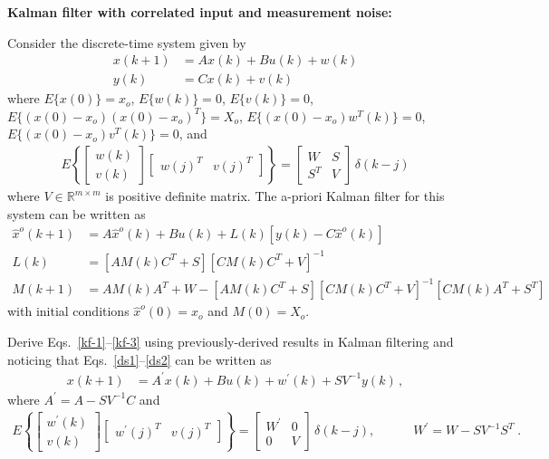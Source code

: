 \item
{\bf Kalman filter with correlated input and measurement noise:}

Consider the discrete-time system given by
\begin{align}
    x(k+1) & = A x(k) + B u(k) + w(k)
        \label{ds1} \\
    y(k) & = C x(k) + v(k)
        \label{ds2}
\end{align}
where $E \{x(0)\} = x_o$, $E\{ w(k) \} = 0$, $E\{v(k)\} = 0$, $E \{ (x(0) - x_o)(x(0) - x_o)^T \} = X_o$, $E\{ (x(0) - x_o) w^T(k) \} = 0$, $E \{(x(0) - x_o) v^T(k) \} = 0$, and
\begin{align*}
    E \left \{ \begin{bmatrix}
            w(k) \\
            v(k)
        \end{bmatrix} \begin{bmatrix}
            w(j)^T & v(j)^T
        \end{bmatrix} \right \} = \begin{bmatrix}
            W & S \\
            S^T & V
        \end{bmatrix} \, \delta(k-j)
\end{align*}
where $V \in \mathbb{R} ^{m \times m}$ is positive definite matrix. The a-priori Kalman filter for this system can be written as
\begin{align}
    \hat{x}^o(k+1) & = A \hat{x}^o(k) + B u(k) + L(k) [ y(k) - C \hat{x}^o(k) ]
        \label{kf-1} \\
    L(k) & = [ A M(k) C^T + S ] [ C M(k) C^T + V ] ^{-1}\\
    M(k+1) & = A M(k) A^T + W - [AM(k) C^T + S] [ C M(k) C^T + V ]^{-1} [CM(k) A^T + S^T]
        \label{kf-3}
\end{align}
with initial conditions $\hat{x}^o(0) = x_o$ and $M(0) = X_o$.

Derive Eqs.~\eqref{kf-1}--\eqref{kf-3} using previously-derived results in Kalman filtering and noticing that Eqs.~\eqref{ds1}--\eqref{ds2} can be written as
\begin{align*}
    x(k+1) & = A^{'} x(k) + B u(k) + w^{'}(k) + SV^{-1} y(k) \, ,
\end{align*}
where $A^{'} = A - SV^{-1}C$ and
\begin{align*}
    E \left \{ \begin{bmatrix}
            w^{'}(k) \\
            v(k)
        \end{bmatrix} \begin{bmatrix}
            w^{'}(j)^T & v(j)^T
        \end{bmatrix} \right \} = \begin{bmatrix}
            W^{'} & 0 \\
            0 & V
        \end{bmatrix} \, \delta(k-j),\hspace{3em}W^{'} = W - S V^{-1} S^T \; .
\end{align*}


